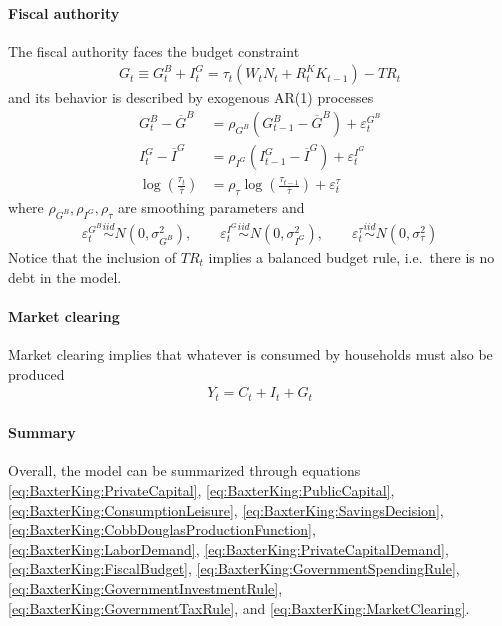 \paragraph*{Fiscal authority}
The fiscal authority faces the budget constraint
\begin{align}
G_t \equiv G_t^B + I_t^G = \tau_t(W_t N_t + R^K_{t} K_{t-1}) - TR_t\label{eq:BaxterKing:FiscalBudget}
\end{align}
and its behavior is described by exogenous AR{(1)} processes
\begin{align}
G_t^B-\overline{G}^B &= \rho_{G^B} \left(G_{t-1}^B - \overline{G}^B\right) +  \varepsilon_t^{G^B} \label{eq:BaxterKing:GovernmentSpendingRule}
\\
I_t^G-\overline{I}^G &= \rho_{I^G} \left(I_{t-1}^G - \overline{I}^G\right) +  \varepsilon_t^{I^G} \label{eq:BaxterKing:GovernmentInvestmentRule}
\\
\log\left(\frac{\tau_t}{\overline{\tau}}\right) &= \rho_\tau \log\left(\frac{\tau_{t-1}}{\overline{\tau}}\right) +  \varepsilon_t^\tau \label{eq:BaxterKing:GovernmentTaxRule}
\end{align}
where \(\rho_{G^B}, \rho_{I^G}, \rho_{\tau}\) are smoothing parameters and
\begin{align*}
\varepsilon_t^{G^B}\overset{iid}{\sim} N(0,\sigma_{G^B}^2), \qquad
\varepsilon_t^{I^G}\overset{iid}{\sim} N(0,\sigma_{I^G}^2), \qquad
\varepsilon_t^\tau\overset{iid}{\sim} N(0,\sigma_{\tau}^2)
\end{align*}
Notice that the inclusion of \({TR}_t\) implies a balanced budget rule, i.e.\ there is no debt in the model.

\paragraph*{Market clearing}
Market clearing implies that whatever is consumed by households must also be produced
\begin{align}
Y_t = C_t + I_t + G_t \label{eq:BaxterKing:MarketClearing}
\end{align}

\paragraph{Summary}
Overall, the model can be summarized through equations
{\eqref{eq:BaxterKing:PrivateCapital}},
{\eqref{eq:BaxterKing:PublicCapital}},
{\eqref{eq:BaxterKing:ConsumptionLeisure}},
{\eqref{eq:BaxterKing:SavingsDecision}},
{\eqref{eq:BaxterKing:CobbDouglasProductionFunction}},
{\eqref{eq:BaxterKing:LaborDemand}},
{\eqref{eq:BaxterKing:PrivateCapitalDemand}},
{\eqref{eq:BaxterKing:FiscalBudget}},
{\eqref{eq:BaxterKing:GovernmentSpendingRule}},
{\eqref{eq:BaxterKing:GovernmentInvestmentRule}},
{\eqref{eq:BaxterKing:GovernmentTaxRule}},
and
{\eqref{eq:BaxterKing:MarketClearing}}.


